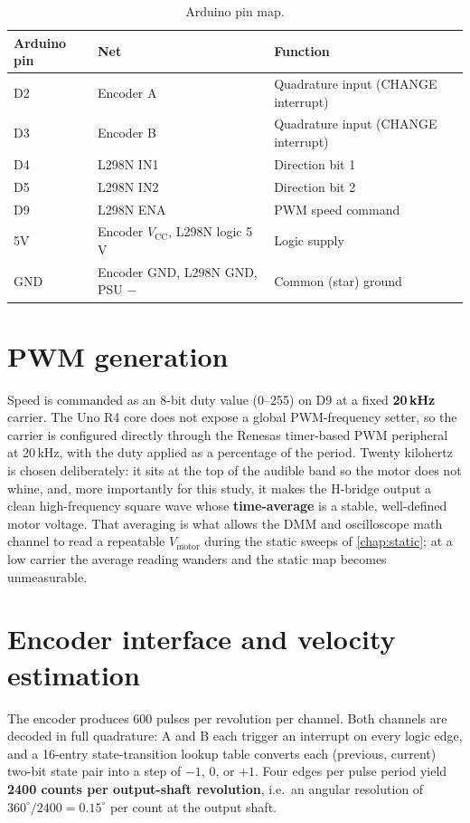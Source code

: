 \begin{table}[t]
  \centering
  \caption{Arduino pin map.}
  \label{tab:pinmap}
  \small
  \begin{tabular}{@{}llp{6cm}@{}}
    \toprule
    Arduino pin & Net & Function \\
    \midrule
    D2  & Encoder A & Quadrature input (CHANGE interrupt) \\
    D3  & Encoder B & Quadrature input (CHANGE interrupt) \\
    D4  & L298N IN1 & Direction bit 1 \\
    D5  & L298N IN2 & Direction bit 2 \\
    D9  & L298N ENA & PWM speed command \\
    5V  & Encoder $V_{\mathrm{CC}}$, L298N logic 5\,V & Logic supply \\
    GND & Encoder GND, L298N GND, PSU $-$ & Common (star) ground \\
    \bottomrule
  \end{tabular}
\end{table}

\section{PWM generation}
\label{sec:pwm}

Speed is commanded as an 8-bit duty value (0--255) on D9 at a fixed \textbf{20\,kHz} carrier. The Uno R4 core does not expose a global PWM-frequency setter, so the carrier is configured directly through the Renesas timer-based PWM peripheral at 20\,kHz, with the duty applied as a percentage of the period. Twenty kilohertz is chosen deliberately: it sits at the top of the audible band so the motor does not whine, and, more importantly for this study, it makes the H-bridge output a clean high-frequency square wave whose \textbf{time-average} is a stable, well-defined motor voltage. That averaging is what allows the DMM and oscilloscope math channel to read a repeatable $V_{\mathrm{motor}}$ during the static sweeps of \cref{chap:static}; at a low carrier the average reading wanders and the static map becomes unmeasurable.

\section{Encoder interface and velocity estimation}
\label{sec:encoder}

The encoder produces 600 pulses per revolution per channel. Both channels are decoded in full quadrature: A and B each trigger an interrupt on every logic edge, and a 16-entry state-transition lookup table converts each (previous, current) two-bit state pair into a step of $-1$, $0$, or $+1$. Four edges per pulse period yield \textbf{2400 counts per output-shaft revolution}, i.e.\ an angular resolution of $360^\circ/2400 = \mathbf{0.15^\circ}$ per count at the output shaft.

